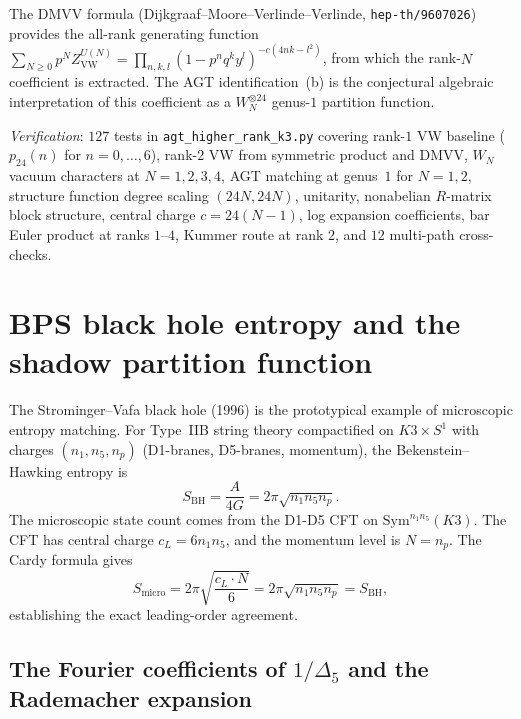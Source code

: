 \begin{conjecture}
The DMVV formula (Dijkgraaf--Moore--Verlinde--Verlinde, \texttt{hep-th/9607026})
provides the all-rank generating function
$\sum_{N \ge 0} p^N Z_{\mathrm{VW}}^{U(N)} =
\prod_{n,k,l}(1 - p^n q^k y^l)^{-c(4nk - l^2)}$, from which
the rank-$N$ coefficient is extracted.  The AGT identification~(b)
is the conjectural algebraic interpretation of this coefficient
as a $W_N^{\otimes 24}$ genus-$1$ partition function.
\end{conjecture}

\noindent\textit{Verification}: $127$ tests in
\texttt{agt\_higher\_rank\_k3.py} covering rank-$1$ VW baseline
($p_{24}(n)$ for $n = 0, \ldots, 6$), rank-$2$ VW from symmetric
product and DMVV, $W_N$ vacuum characters at $N = 1, 2, 3, 4$,
AGT matching at genus~$1$ for $N = 1, 2$, structure function degree
scaling $(24N, 24N)$, unitarity, nonabelian $R$-matrix block
structure, central charge $c = 24(N-1)$, log expansion coefficients,
bar Euler product at ranks $1$--$4$, Kummer route at rank $2$,
and $12$ multi-path cross-checks.

\section{BPS black hole entropy and the shadow partition function}
\label{sec:k3e-bps-entropy}

The Strominger--Vafa black hole (1996) is the prototypical example of microscopic entropy matching.
For Type~IIB string theory compactified on $K3 \times S^1$ with charges $(n_1, n_5, n_p)$ (D1-branes, D5-branes, momentum), the Bekenstein--Hawking entropy is
\begin{equation}
\label{eq:k3e-strominger-vafa}
 S_{\mathrm{BH}} = \frac{A}{4G} = 2\pi\sqrt{n_1 n_5 n_p}.
\end{equation}
The microscopic state count comes from the D1-D5 CFT on $\mathrm{Sym}^{n_1 n_5}(K3)$. The CFT has central charge $c_L = 6 n_1 n_5$, and the momentum level is $N = n_p$. The Cardy formula gives
\begin{equation}
\label{eq:k3e-cardy}
 S_{\mathrm{micro}} = 2\pi\sqrt{\frac{c_L \cdot N}{6}} = 2\pi\sqrt{n_1 n_5 n_p} = S_{\mathrm{BH}},
\end{equation}
establishing the exact leading-order agreement.

\subsection{The Fourier coefficients of $1/\Delta_5$ and the Rademacher expansion}
\label{subsec:k3e-rademacher}

